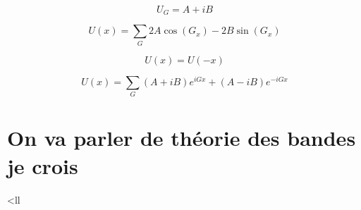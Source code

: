 



$$U_{G} = A + iB$$ 

$$U(x) = \sum_{G} 2 A \cos(G_{x} ) - 2 B\sin(G_{x} )$$ 

$$U(x) = U(-x)$$ 

$$U(x) = \sum_{G} (A + iB) e^{iGx} + (A- iB) e^{-iGx}$$ 


\section*{On va parler de théorie des bandes je crois}
	




<ll
